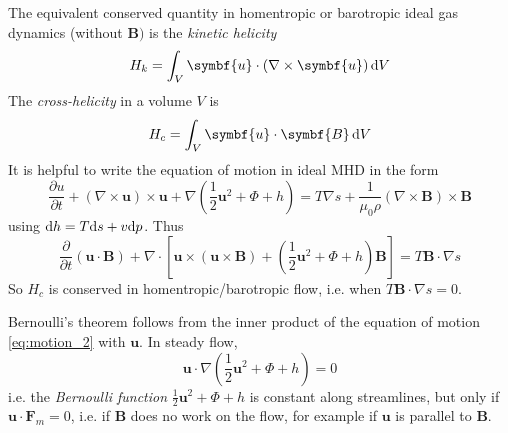 \documentclass{jknotes}
\newcommand{\B}{\symbf{B}}
\renewcommand{\u}{\symbf{u}}
\begin{document}
The equivalent conserved quantity in homentropic or barotropic ideal gas
dynamics (without $\B)$ is the \emph{kinetic helicity}
\begin{equation}
	H_k = \int_V \u \cdot (\nabla \times \u) \, \diffd V
\end{equation}
The \emph{cross-helicity} in a volume $V$ is
\begin{equation}
	H_c = \int_V \u \cdot \B \, \diffd V
\end{equation}
It is helpful to write the equation of motion in ideal MHD in the form
\begin{equation}
	\frac{\partial u}{\partial t} + (\nabla \times \u) \times \u + \nabla
	(\frac{1}{2}\u^2 + \Phi + h) = T \nabla s + \frac{1}{\mu_0 \rho} (\nabla
	\times \B) \times \B
	\label{eq:motion_2}
\end{equation}
using $\diffd h = T \diffd s + v \diffd p$. Thus
\begin{equation}
	\frac{\partial}{\partial t} (\u \cdot \B) + \nabla \cdot \left[ \u \times
	(\u \times \B) + (\frac{1}{2}\u^2 + \Phi + h)\B \right] = T \B \cdot
	\nabla s
\end{equation}
So $H_c$ is conserved in homentropic/barotropic flow, i.e. when $T \B \cdot
\nabla s = 0 $.

Bernoulli's theorem follows from the inner product of the equation of motion
\eqref{eq:motion_2} with $\u$. In steady flow,
\begin{equation}
	\u \cdot \nabla (\frac{1}{2}\u^2 + \Phi + h) = 0
\end{equation}
i.e. the \emph{Bernoulli function} $\frac{1}{2}\u^2 + \Phi + h$ is constant
along streamlines, but only if $\u \cdot \symbf{F}_m = 0$, i.e. if $\B$ does
no work on the flow, for example if $\u$ is parallel to $\B$.
\end{document}
